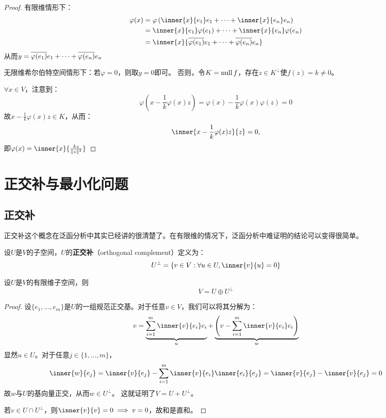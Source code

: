 \begin{proof}
    有限维情形下：
    \begin{align*}
        \varphi(x) &= \varphi\left(\inner{x}{e_1}e_{1} + \dots +
        \inner{x}{e_n}e_{n}\right) \\
        &= \inner{x}{e_1}\varphi(e_1) + \dots + \inner{x}{e_n}\varphi(e_n) \\
        &= \inner{x}{\conj{\varphi(e_1)} e_1 + \dots +
        \conj{\varphi(e_n)} e_n}
    \end{align*}
    从而\(y = \overline{\varphi(e_1)} e_1 + \dots +
    \overline{\varphi(e_n)} e_n\)

    无限维希尔伯特空间情形下：若\(\varphi = 0\)，则取\(y = 0\)即可。
    否则，令\(K = \operatorname{null} f\)，存在\(z \in K^\perp \)使\(f(z) = k \neq 0\)。

    \(\forall x \in V\)，注意到：
    \[
        \varphi(x-\frac{1}{k} \varphi(x)z) = \varphi(x) - \frac{1}{k}
        \varphi(x) \varphi(z) =0
    \]
    故\(x - \frac{1}{k} \varphi(x) z \in K\)，从而：\[
        \inner{x-\frac{1}{k}\varphi(x)z}{z} = 0,
    \]
    即\(\varphi(x) = \inner{x}{\frac{kz}{\norm{z}^{2}}}\)
\end{proof}

\section{正交补与最小化问题}
\subsection{正交补}

正交补这个概念在泛函分析中其实已经讲的很清楚了。在有限维的情况下，泛函分析中难证明的结论可以变得很简单。

\begin{definition}[正交补]
    设\(U\)是\(V\)的子空间，\(U\)的\textbf{正交补}（orthogonal complement）定义为：
    \[
        U^\perp = \{v \in V : \forall u \in U, \inner{v}{u} = 0\}
    \]
\end{definition}

\begin{theorem}
    设\(U\)是\(V\)的有限维子空间，则
    \[
        V = U \oplus U^\perp
    \]
\end{theorem}

\begin{proof}
    设\(\{e_1, \dots, e_m\}\)是\(U\)的一组规范正交基。对于任意\(v \in V\)，我们可以将其分解为：
    \[
        v = \underbrace{\sum_{i=1}^m \inner{v}{e_i} e_i}_{u} +
        \underbrace{\left( v - \sum_{i=1}^m \inner{v}{e_i} e_i \right)}_{w}
    \]
    显然\(u \in U\)。对于任意\(j \in \{1, \dots, m\}\)，
    \[
        \inner{w}{e_j} = \inner{v}{e_j} - \sum_{i=1}^m \inner{v}{e_i}
        \inner{e_i}{e_j} = \inner{v}{e_j} - \inner{v}{e_j} = 0
    \]
    故\(w\)与\(U\)的基向量正交，从而\(w \in U^\perp\)。
    这就证明了\(V = U + U^\perp\)。

    若\(v \in U \cap U^\perp\)，则\(\inner{v}{v} = 0 \implies v = 0\)，故和是直和。
\end{proof}

